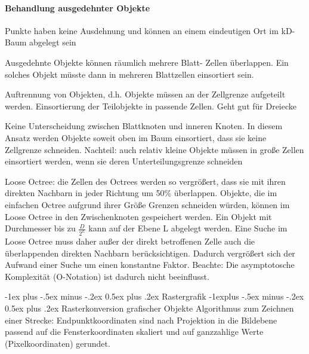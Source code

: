 \documentclass[landscape]{article}
\makeatletter
\renewcommand{\section}{\@startsection{section}{1}{0mm}%
                                {-1ex plus -.5ex minus -.2ex}%
                                {0.5ex plus .2ex}%
                                {\normalfont\large\bfseries}}
\renewcommand{\subsection}{\@startsection{subsection}{2}{0mm}%
                                {-1explus -.5ex minus -.2ex}%
                                {0.5ex plus .2ex}%
                                {\normalfont\normalsize\bfseries}}
\makeatother
\begin{document}
\begin{multicols}{3}
  \paragraph{Behandlung ausgedehnter Objekte}
  \begin{itemize*}
    \item Punkte haben keine Ausdehnung und können an einem eindeutigen Ort im kD-Baum abgelegt sein
    \item Ausgedehnte Objekte können räumlich mehrere Blatt- Zellen überlappen. Ein solches Objekt müsste dann in mehreren Blattzellen einsortiert sein.
  \end{itemize*}
  \begin{enumerate*}
    \item Auftrennung von Objekten, d.h. Objekte müssen an der Zellgrenze aufgeteilt werden. Einsortierung der Teilobjekte in passende Zellen. Geht gut für Dreiecke
    \item Keine Unterscheidung zwischen Blattknoten und inneren Knoten. In diesem Ansatz werden Objekte soweit oben im Baum einsortiert, dass sie keine Zellgrenze schneiden. Nachteil: auch relativ kleine Objekte müssen in große Zellen einsortiert werden, wenn sie deren Unterteilungsgrenze schneiden
    \item Loose Octree: die Zellen des Octrees werden so vergrößert, dass sie mit ihren direkten Nachbarn in jeder Richtung um 50\% überlappen. Objekte, die im einfachen Octree aufgrund ihrer Größe Grenzen schneiden würden, können im Loose Octree in den Zwischenknoten gespeichert werden. Ein Objekt mit Durchmesser bis zu $\frac{D}{2^L}$ kann auf der Ebene L abgelegt werden. Eine Suche im Loose Octree muss daher außer der direkt betroffenen Zelle auch die überlappenden direkten Nachbarn berücksichtigen. Dadurch vergrößert sich der Aufwand einer Suche um einen konstantne Faktor. Beachte: Die asymptotosche Komplexität (O-Notation) ist dadurch nicht beeinflusst.
  \end{enumerate*}
  
  \section{Rastergrafik}
  \subsection{Rasterkonversion grafischer Objekte}
  Algorithmus zum Zeichnen einer Strecke: Endpunktkoordinaten sind nach Projektion in die Bildebene passend auf die Fensterkoordinaten skaliert und auf ganzzahlige Werte (Pixelkoordinaten) gerundet.
  

\end{multicols}
\end{document}
